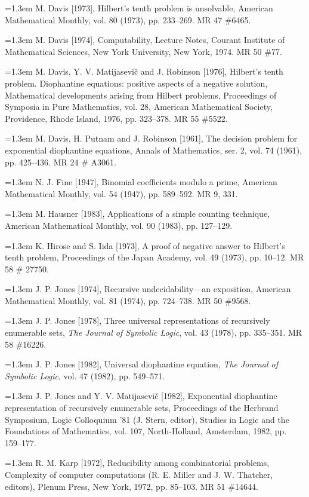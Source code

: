 \documentclass[11pt,leqno]{article}
\newcommand{\bibentry}[1]{\par\noindent\hangindent=1.3em\hangafter=1 #1\par\smallskip}
\begin{document}
\bibentry{M. Davis [1973], Hilbert's tenth problem is unsolvable, American Mathematical Monthly, vol. 80 (1973), pp. 233--269. MR 47 \#6465.}

\bibentry{M. Davis [1974], Computability, Lecture Notes, Courant Institute of Mathematical Sciences, New York University, New York, 1974. MR 50 \#77.}

\bibentry{M. Davis, Y. V. Matijasevi\v{c} and J. Robinson [1976], Hilbert's tenth problem. Diophantine equations: positive aspects of a negative solution, Mathematical developments arising from Hilbert problems, Proceedings of Symposia in Pure Mathematics, vol. 28, American Mathematical Society, Providence, Rhode Island, 1976, pp. 323--378. MR 55 \#5522.}

\bibentry{M. Davis, H. Putnam and J. Robinson [1961], The decision problem for exponential diophantine equations, Annals of Mathematics, ser. 2, vol. 74 (1961), pp. 425--436. MR 24 \# A3061.}

\bibentry{N. J. Fine [1947], Binomial coefficients modulo a prime, American Mathematical Monthly, vol. 54 (1947), pp. 589--592. MR 9, 331.}

\bibentry{M. Hausner [1983], Applications of a simple counting technique, American Mathematical Monthly, vol. 90 (1983), pp. 127--129.}

\bibentry{K. Hirose and S. Iida [1973], A proof of negative answer to Hilbert's tenth problem, Proceedings of the Japan Academy, vol. 49 (1973), pp. 10--12. MR 58 \# 27750.}

\bibentry{J. P. Jones [1974], Recursive undecidability---an exposition, American Mathematical Monthly, vol. 81 (1974), pp. 724--738. MR 50 \#9568.}

\bibentry{J. P. Jones [1978], Three universal representations of recursively enumerable sets, \textit{The Journal of Symbolic Logic}, vol. 43 (1978), pp. 335--351. MR 58 \#16226.}

\bibentry{J. P. Jones [1982], Universal diophantine equation, \textit{The Journal of Symbolic Logic}, vol. 47 (1982), pp. 549--571.}

\bibentry{J. P. Jones and Y. V. Matijasevi\v{c} [1982], Exponential diophantine representation of recursively enumerable sets, Proceedings of the Herbrand Symposium, Logic Colloquium '81 (J. Stern, editor), Studies in Logic and the Foundations of Mathematics, vol. 107, North-Holland, Amsterdam, 1982, pp. 159--177.}

\bibentry{R. M. Karp [1972], Reducibility among combinatorial problems, Complexity of computer computations (R. E. Miller and J. W. Thatcher, editors), Plenum Press, New York, 1972, pp. 85--103. MR 51 \#14644.}
\end{document}
